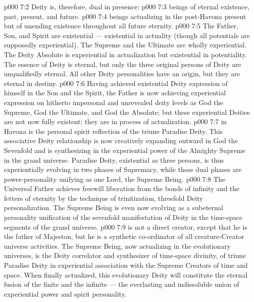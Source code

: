 \vs p000 7:2 Deity is, therefore, dual in presence:
\vs p000 7:3 \bibnobreakspace {} beings of eternal existence, past, present, and future.
\vs p000 7:4 \bibnobreakspace {} beings actualizing in the post\hyp{}Havona present but of unending existence throughout all future eternity.
\vs p000 7:5 \pc The Father, Son, and Spirit are existential --- existential in actuality (though all potentials are supposedly experiential). The Supreme and the Ultimate are wholly experiential. The Deity Absolute is experiential in actualization but existential in potentiality. The essence of Deity is eternal, but only the three original persons of Deity are unqualifiedly eternal. All other Deity personalities have an origin, but they are eternal in destiny.
\vs p000 7:6 Having achieved existential Deity expression of himself in the Son and the Spirit, the Father is now achieving experiential expression on hitherto impersonal and unrevealed deity levels as God the Supreme, God the Ultimate, and God the Absolute; but these experiential Deities are not now fully existent; they are in process of actualization.
\vs p000 7:7 \pc {} in Havona is the personal spirit reflection of the triune Paradise Deity. This associative Deity relationship is now creatively expanding outward in God the Sevenfold and is synthesizing in the experiential power of the Almighty Supreme in the grand universe. Paradise Deity, existential as three persons, is thus experientially evolving in two phases of Supremacy, while these dual phases are power\hyp{}personality unifying as one Lord, the Supreme Being.
\vs p000 7:8 The Universal Father achieves freewill liberation from the bonds of infinity and the fetters of eternity by the technique of trinitization, threefold Deity personalization. The Supreme Being is even now evolving as a subeternal personality unification of the sevenfold manifestation of Deity in the time\hyp{}space segments of the grand universe.
\vs p000 7:9 \pc {} is not a direct creator, except that he is the father of Majeston, but he is a synthetic co\hyp{}ordinator of all creature\hyp{}Creator universe activities. The Supreme Being, now actualizing in the evolutionary universes, is the Deity correlator and synthesizer of time\hyp{}space divinity, of triune Paradise Deity in experiential association with the Supreme Creators of time and space. When finally actualized, this evolutionary Deity will constitute the eternal fusion of the finite and the infinite --- the everlasting and indissoluble union of experiential power and spirit personality.
